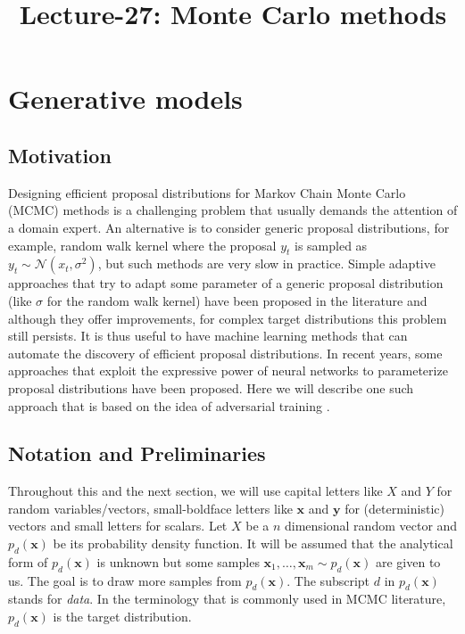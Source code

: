 \documentclass[letterpaper,english,10pt]{article}
\title{Lecture-27: Monte Carlo methods}
\begin{document}
\maketitle

\section{Generative models}

\subsection{Motivation}
Designing efficient proposal distributions for Markov Chain Monte Carlo (MCMC) methods is a challenging problem that usually demands the attention of a domain expert. An alternative is to consider generic proposal distributions, for example, random walk kernel where the proposal $y_t$ is sampled as $y_t \sim \mathcal{N}(x_t, \sigma^2)$, but such methods are very slow in practice. Simple adaptive approaches that try to adapt some parameter of a generic proposal distribution (like $\sigma$ for the random walk kernel) have been proposed in the literature and although they offer improvements, for complex target distributions this problem still persists. It is thus useful to have machine learning methods that can automate the discovery of efficient proposal distributions. In recent years, some approaches that exploit the expressive power of neural networks to parameterize proposal distributions have been proposed. Here we will describe one such approach that is based on the idea of adversarial training \cite{SongEtAl:2017:ANiceMCAdversarialTrainingForMCMC}.


\subsection{Notation and Preliminaries}
Throughout this and the next section, we will use capital letters like $X$ and $Y$ for random variables/vectors, small-boldface letters like $\mathbf{x}$ and $\mathbf{y}$ for (deterministic) vectors and small letters for scalars. Let $X$ be a $n$ dimensional random vector and $p_d(\mathbf{x})$ be its probability density function. It will be assumed that the analytical form of $p_d(\mathbf{x})$ is unknown but some samples $\mathbf{x}_1, \dots, \mathbf{x}_m \sim p_d(\mathbf{x})$ are given to us. The goal is to draw more samples from $p_d(\mathbf{x})$. The subscript $d$ in $p_d(\mathbf{x})$ stands for \textit{data}. In the terminology that is commonly used in MCMC literature, $p_d(\mathbf{x})$ is the target distribution.
\end{document}
